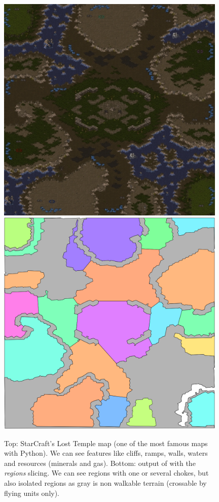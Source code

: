 \begin{figure}[h]
\begin{center}
\includegraphics[width=11cm]{images/ICCup_lost_temple_24.jpg}
\includegraphics[width=11cm]{images/iccup_lost_temple_24scx-analyzed.png}
\caption{Top: StarCraft's Lost Temple map (one of the most famous maps with Python). We can see features like cliffs, ramps, walls, waters and resources (minerals and gas). Bottom: output of  with the \textit{regions} slicing. We can see regions with one or several chokes, but also isolated regions as gray is non walkable terrain (crossable by flying units only).}
\thispagestyle{empty}
\label{fig:BWTA}
\end{center}
\end{figure}




